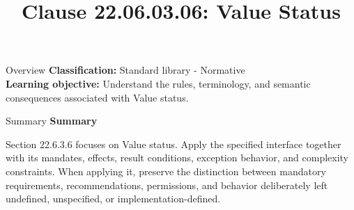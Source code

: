 \documentclass[10pt,letterpaper]{article}
\title{Clause 22.06.03.06: Value Status}
\author{}
\date{}
\begin{document}
\maketitle
\begin{CornellOverviewBox}{Overview}
\textbf{Classification:} Standard library - Normative\\[2pt]
\textbf{Learning objective:} Understand the rules, terminology, and semantic consequences associated with Value status.
\end{CornellOverviewBox}\begin{CornellSummaryBox}{Summary}
{\sffamily\bfseries\color{Accent} Summary}\par\vspace{3pt}Section 22.6.3.6 focuses on Value status. Apply the specified interface together with its mandates, effects, result conditions, exception behavior, and complexity constraints. When applying it, preserve the distinction between mandatory requirements, recommendations, permissions, and behavior deliberately left undefined, unspecified, or implementation-defined.
\end{CornellSummaryBox}
\end{document}
